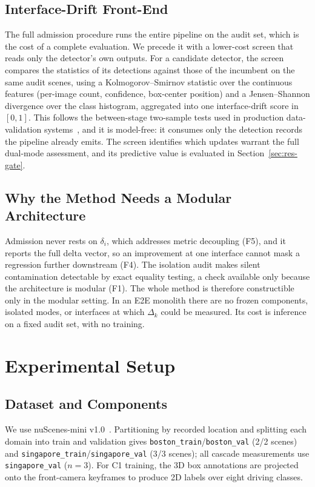 \documentclass[conference]{IEEEtran}
\begin{document}
\subsection{Interface-Drift Front-End}
\label{sec:cara-frontend}
The full admission procedure runs the entire pipeline on the audit set, which is
the cost of a complete evaluation. We precede it with a lower-cost screen that
reads only the detector's own outputs. For a candidate detector, the screen
compares the statistics of its detections against those of the incumbent on the
same audit scenes, using a Kolmogorov--Smirnov statistic over the continuous
features
(per-image count, confidence, box-center position) and a Jensen--Shannon
divergence over the class histogram, aggregated into one interface-drift score in
$[0,1]$. This follows the between-stage two-sample tests used in production
data-validation systems~\cite{breck2019data}, and it is model-free: it consumes
only the detection records the pipeline already emits. The screen identifies
which updates warrant the full dual-mode assessment, and its predictive value is
evaluated in Section~\ref{sec:res-gate}.

\subsection{Why the Method Needs a Modular Architecture}
Admission never rests on $\delta_i$, which addresses metric decoupling (F5), and
it reports the full delta vector, so an improvement at one interface cannot mask
a regression further downstream (F4). The isolation audit makes silent
contamination detectable by exact equality testing, a check available only
because the architecture is modular (F1). The whole method is therefore
constructible only in the modular setting. In an E2E monolith there are no frozen
components, isolated modes, or interfaces at which $\Delta_k$ could be measured.
Its cost is inference on a fixed audit set, with no training.

\section{Experimental Setup}
\label{sec:setup}

\subsection{Dataset and Components}
We use nuScenes-mini v1.0~\cite{caesar2020nuscenes}. Partitioning by recorded
location and splitting each domain into train and validation gives
\texttt{boston\_train}/\texttt{boston\_val} (2/2 scenes) and
\texttt{singapore\_train}/\texttt{singapore\_val} (3/3 scenes); all cascade
measurements use \texttt{singapore\_val} ($n=3$). For C1 training, the 3D box
annotations are projected onto the front-camera keyframes to produce 2D labels
over eight driving classes.
\end{document}
